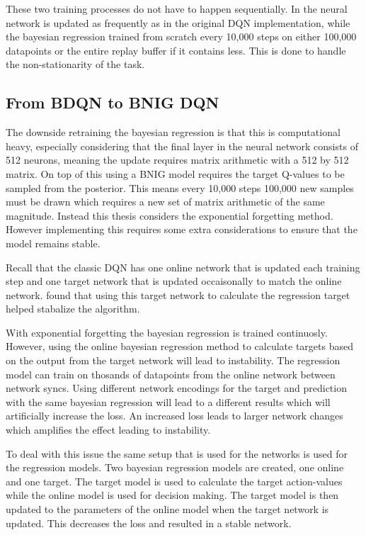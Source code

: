 These two training processes do not have to happen sequentially. In \cite{azziz_2018} the neural network is updated as frequently as in the original DQN implementation, while the bayesian regression trained from scratch every 10,000 steps on either 100,000 datapoints or the entire replay buffer if it contains less. This is done to handle the non-stationarity of the task. 

\subsection{From BDQN to BNIG DQN}

The downside retraining the bayesian regression is that this is computational heavy, especially considering that the final layer in the neural network consists of 512 neurons, meaning the update requires matrix arithmetic with a 512 by 512 matrix. On top of this using a BNIG model requires the target Q-values to be sampled from the posterior. This means every 10,000 steps 100,000 new samples must be drawn which requires a new set of matrix arithmetic of the same magnitude. Instead this thesis considers the exponential forgetting method. However implementing this requires some extra considerations to ensure that the model remains stable.

Recall that the classic DQN has one online network that is updated each training step and one target network that is updated occaisonally to match the online network. \cite{mnih_2013} found that using this target network to calculate the regression target helped stabalize the algorithm.

With exponential forgetting the bayesian regression is trained continuosly. However, using the online bayesian regression method to calculate targets based on the output from the target network will lead to instability. The regression model can train on thosands of datapoints from the online network between network syncs. Using different network encodings for the target and prediction with the same bayesian regression will lead to a different results which will artificially increase the loss. An increased loss leads to larger network changes which amplifies the effect leading to instability.

To deal with this issue the same setup that is used for the networks is used for the regression models. Two bayesian regression models are created, one online and one target. The target model is used to calculate the target action-values while the online model is used for decision making. The target model is then updated to the parameters of the online model when the target network is updated. This decreases the loss and resulted in a stable network.


